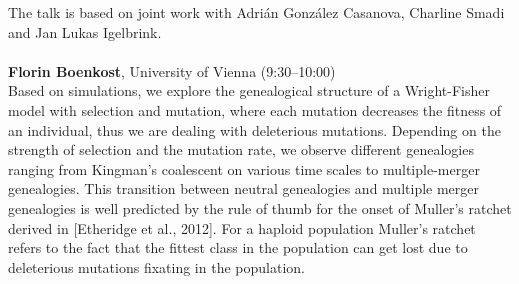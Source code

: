 \documentclass[12pt,a4paper]{article}
\begin{document}
 The talk is based on joint work with Adri\'an Gonz\'alez Casanova, Charline Smadi and Jan Lukas Igelbrink. \\
\\[1ex]{ \large \textbf{ Florin Boenkost}}, University of Vienna (9:30--10:00) \\[2ex] Based on simulations, we explore the genealogical structure of a Wright-Fisher model with selection and mutation, where each mutation decreases the fitness of an individual, thus we are dealing with deleterious mutations. Depending on the strength of selection and the mutation rate, we observe different genealogies ranging from Kingman's coalescent on various time scales to multiple-merger genealogies. This transition between neutral genealogies and multiple merger genealogies is well predicted by the rule of thumb for the onset of Muller's ratchet derived in [Etheridge et al., 2012]. For a haploid population Muller's ratchet refers to the fact that the fittest class in the population can get lost due to deleterious mutations fixating in the population. 
\end{document}
